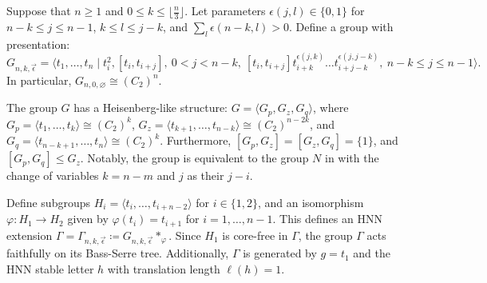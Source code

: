 \documentclass[12pt,leqno]{amsart}
\newcommand{\2}{L^2_{\rm per}(0, T)}
\numberwithin{equation}{section}
\numberwithin{figure}{section}
\begin{document}
Suppose that $n\geq 1$ and $0\leq k\leq \lfloor\frac{n}{3}\rfloor$. Let parameters $\epsilon(j,l)\in \{0,1\}$ for $n-k\leq j\leq n-1$, $k\leq l\leq j-k$, and $\sum_{l}\epsilon(n-k,l)>0$. Define a group with presentation:
\[
G_{n,k,\vec{\epsilon}} = \langle t_1,\dots, t_n\mid t_i^2, [t_i,t_{i+j}],\ 0<j<n-k,\ [t_i,t_{i+j}]t_{i+k}^{\epsilon(j,k)}\dots t_{i+j-k}^{\epsilon(j,j-k)},\ n-k\leq j\leq n-1\rangle.
\]
In particular, $G_{n,0,\varnothing}\cong (C_2)^n$.

The group $G$ has a Heisenberg-like structure: $G = \langle G_p,G_z,G_q\rangle$, where $G_p = \langle t_1,\dots, t_k\rangle\cong (C_2)^k$, $G_z = \langle t_{k+1},\dots, t_{n-k}\rangle\cong (C_2)^{n-2k}$, and $G_q = \langle t_{n-k+1},\dots, t_n\rangle\cong (C_2)^k$. Furthermore, $[G_p,G_z] = [G_z,G_q] = \{1\}$, and $[G_p,G_q] \leq G_z$. Notably, the group is equivalent to the group $N$ in \cite{djokovic1980class} with the change of variables $k = n-m$ and $j$ as their $j-i$.

Define subgroups $H_i = \langle t_i,\dots, t_{i+n-2}\rangle$ for $i \in \{1,2\}$, and an isomorphism $\varphi:H_1\to H_2$ given by $\varphi(t_i) = t_{i+1}$ for $i=1,\dots, n-1$. This defines an HNN extension $\Gamma = \Gamma_{n,k,\vec{\epsilon}}\coloneqq G_{n,k,\vec{\epsilon}}*_\varphi$. Since $H_1$ is core-free in $\Gamma$, the group $\Gamma$ acts faithfully on its Bass-Serre tree. Additionally, $\Gamma$ is generated by $g = t_1$ and the HNN stable letter $h$ with translation length $\ell(h) = 1$.
\end{document}

